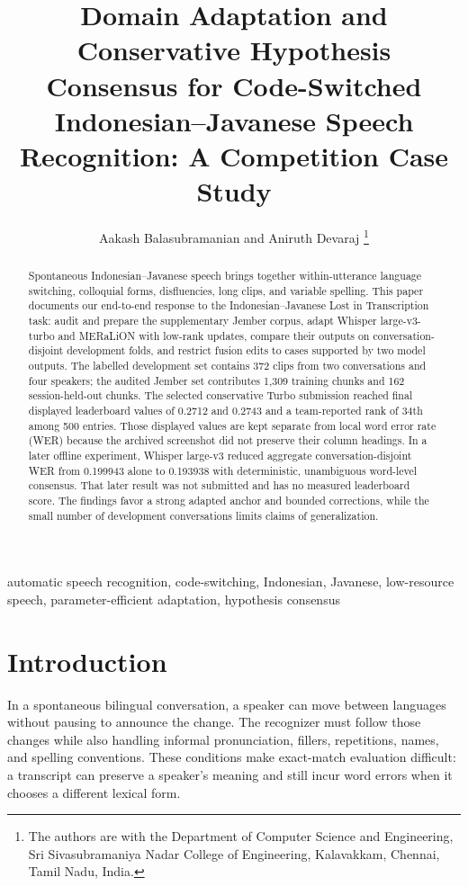 \documentclass[journal]{IEEEtran}
\title{Domain Adaptation and Conservative Hypothesis Consensus for Code-Switched Indonesian--Javanese Speech Recognition: A Competition Case Study}
\author{Aakash Balasubramanian and Aniruth Devaraj\quad\href{https://github.com/06-aakash-06/lost-in-transcription}{\faGithub}%
\thanks{The authors are with the Department of Computer Science and Engineering, Sri Sivasubramaniya Nadar College of Engineering, Kalavakkam, Chennai, Tamil Nadu, India.}%
}
\begin{document}
\maketitle

\begin{abstract}
Spontaneous Indonesian--Javanese speech brings together within-utterance language switching, colloquial forms, disfluencies, long clips, and variable spelling. This paper documents our end-to-end response to the Indonesian--Javanese Lost in Transcription task: audit and prepare the supplementary Jember corpus, adapt Whisper large-v3-turbo and MERaLiON with low-rank updates, compare their outputs on conversation-disjoint development folds, and restrict fusion edits to cases supported by two model outputs. The labelled development set contains 372 clips from two conversations and four speakers; the audited Jember set contributes 1,309 training chunks and 162 session-held-out chunks. The selected conservative Turbo submission reached final displayed leaderboard values of 0.2712 and 0.2743 and a team-reported rank of 34th among 500 entries. Those displayed values are kept separate from local word error rate (WER) because the archived screenshot did not preserve their column headings. In a later offline experiment, Whisper large-v3 reduced aggregate conversation-disjoint WER from 0.199943 alone to 0.193938 with deterministic, unambiguous word-level consensus. That later result was not submitted and has no measured leaderboard score. The findings favor a strong adapted anchor and bounded corrections, while the small number of development conversations limits claims of generalization.
\end{abstract}

\begin{IEEEkeywords}
automatic speech recognition, code-switching, Indonesian, Javanese, low-resource speech, parameter-efficient adaptation, hypothesis consensus
\end{IEEEkeywords}

\section{Introduction}
In a spontaneous bilingual conversation, a speaker can move between languages without pausing to announce the change. The recognizer must follow those changes while also handling informal pronunciation, fillers, repetitions, names, and spelling conventions. These conditions make exact-match evaluation difficult: a transcript can preserve a speaker's meaning and still incur word errors when it chooses a different lexical form.
\end{document}
